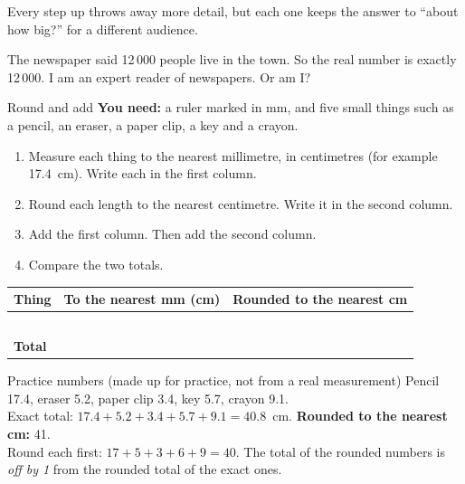 Every step up throws away more detail, but each one keeps the answer to ``about how big?'' for a different audience.

\begin{multix}[hmm]\multixbot[hmm]\tcblower
The newspaper said 12\,000 people live in the town. So the real number is exactly 12\,000. I am an expert reader of newspapers. Or am I?
\end{multix}

\begin{tryit}{Round and add}
\textbf{You need:} a ruler marked in mm, and five small things such as a pencil, an eraser, a paper clip, a key and a crayon.
\begin{enumerate}[leftmargin=1.6em]
\item Measure each thing to the nearest millimetre, in centimetres (for example 17.4~cm). Write each in the first column.
\item Round each length to the nearest centimetre. Write it in the second column.
\item Add the first column. Then add the second column.
\item Compare the two totals.
\end{enumerate}
\par\medskip
\renewcommand{\arraystretch}{1.7}
\begin{tabularx}{\linewidth}{|>{\sffamily\small}p{2.6cm}|X|X|}
\hline
\textbf{Thing} & \textbf{To the nearest mm (cm)} & \textbf{Rounded to the nearest cm}\\ \hline
 & & \\ \hline
 & & \\ \hline
 & & \\ \hline
 & & \\ \hline
 & & \\ \hline
\textbf{Total} & & \\ \hline
\end{tabularx}
\end{tryit}

\begin{worked}{Practice numbers (made up for practice, not from a real measurement)}
Pencil 17.4, eraser 5.2, paper clip 3.4, key 5.7, crayon 9.1.\\
Exact total: $17.4+5.2+3.4+5.7+9.1=40.8$~cm. \textbf{Rounded to the nearest cm:} 41.\\
Round each first: $17+5+3+6+9=40$. The total of the rounded numbers is \emph{off by 1} from the rounded total of the exact ones.
\end{worked}

